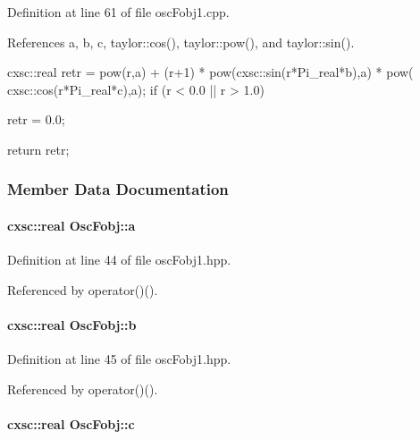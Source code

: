 \-Definition at line 61 of file osc\-Fobj1.\-cpp.



\-References a, b, c, taylor\-::cos(), taylor\-::pow(), and taylor\-::sin().


\begin{DoxyCode}
{
  
  cxsc::real retr = pow(r,a) + (r+1) * pow(cxsc::sin(r*Pi_real*b),a) * pow(
      cxsc::cos(r*Pi_real*c),a);
  if (r < 0.0 || r > 1.0) {
     retr = 0.0;
  
  }
  return retr;
}
\end{DoxyCode}


\subsubsection{\-Member \-Data \-Documentation}
\hypertarget{classOscFobj_a66d7ba153ba87cd3483e4404cf7ffb6a}{
\paragraph[{a}]{\setlength{\rightskip}{0pt plus 5cm}cxsc\-::real {\bf \-Osc\-Fobj\-::a}}}\label{classOscFobj_a66d7ba153ba87cd3483e4404cf7ffb6a}


\-Definition at line 44 of file osc\-Fobj1.\-hpp.



\-Referenced by operator()().

\hypertarget{classOscFobj_ab318db22734e335f06d64d72c9c4892c}{
\paragraph[{b}]{\setlength{\rightskip}{0pt plus 5cm}cxsc\-::real {\bf \-Osc\-Fobj\-::b}}}\label{classOscFobj_ab318db22734e335f06d64d72c9c4892c}


\-Definition at line 45 of file osc\-Fobj1.\-hpp.



\-Referenced by operator()().

\hypertarget{classOscFobj_accc6363665e58cef176c0f0df818d6e7}{
\paragraph[{c}]{\setlength{\rightskip}{0pt plus 5cm}cxsc\-::real {\bf \-Osc\-Fobj\-::c}}}\label{classOscFobj_accc6363665e58cef176c0f0df818d6e7}


